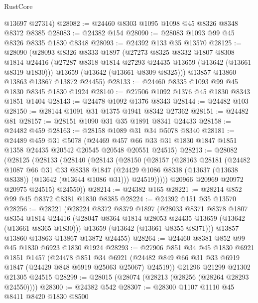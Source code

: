 \begin{lexlean}{RustCore}
\begin{coremodule}
      @13697
      @27314)
@28082 := @24460 @8303 @1095 @1098 @45 @8326 @8348 @8372 @8385
@28083 := @24382 @154
@28090 := @28083 @1093 @99 @45 @8326 @8335 @1830 @8348
@28093 := @24392 @133 @35 @13570
@28125 := @28090
    (@28093
      @8326
      @8333
      @1897
      (@27273
        @8325
        @8332
        @1807
        @8308
        @1814
        @24416
        (@27287 @8318 @1814 @27293 @24435 @13659 (@13642 (@13661 @8319 @1830)))
        @13659
        (@13642 (@13661 @8309 @8325)))
      @13857
      @13860
      @13863
      @13867
      @13872
      @24455)
@28133 := @24460 @8335 @1093 @99 @45 @1830 @8345 @1830 @1924
@28140 := @27506 @1092 @1376 @45 @1830 @8343 @1851 @1404
@28143 := @24478 @1092 @1376 @8343
@28144 := @24482 @103
@28150 := @28144 @1091 @31 @1375 @1941 @8342 @27362
@28151 := @24482 @81
@28157 := @28151 @1090 @31 @35 @1891 @8341 @24433
@28158 := @24482 @459
@28163 := @28158 @1089 @31 @34 @5078 @8340
@28181 := @24489
    @459
    @31
    @5078
    (@24469 @457 @66 @33 @31 @1830 @1847 @1851 @1358 @24435 @20542 @20545 @20548 @20551 @24515)
@28213 := @28082
    (@28125
      (@28133
        (@28140
          (@28143
            (@28150
              (@28157
                (@28163
                  @28181
                  (@24482
                    @1087
                    @66
                    @31
                    @33
                    @8338
                    @1847
                    (@24429 @1086 @8338 (@13637 (@13638 @8338)) (@13642 (@13644 @1086 @31)))
                    @24519)))))
          @20966
          @20969
          @20972
          @20975
          @24515)
        @24550))
@28214 := @24382 @165
@28221 := @28214 @852 @99 @45 @8372 @8381 @1830 @8385
@28224 := @24392 @151 @35 @13570
@28256 := @28221
    (@28224
      @8372
      @8379
      @1897
      (@28033
        @8371
        @8378
        @1807
        @8354
        @1814
        @24416
        (@28047 @8364 @1814 @28053 @24435 @13659 (@13642 (@13661 @8365 @1830)))
        @13659
        (@13642 (@13661 @8355 @8371)))
      @13857
      @13860
      @13863
      @13867
      @13872
      @24455)
@28264 := @24460 @8381 @852 @99 @45 @1830 @6923 @1830 @1924
@28293 := @27906
    @851
    @34
    @45
    @1830
    @6921
    @1851
    @1457
    (@24478
      @851
      @34
      @6921
      (@24482 @849 @66 @31 @33 @6919 @1847 (@24429 @848 @6919 @25063 @25067) @24519))
    @21296
    @21299
    @21302
    @21305
    @24515
@28299 := @28015 (@28074 (@28213 (@28256 (@28264 @28293 @24550))))
@28300 := @24382 @542
@28307 := @28300 @1107 @1110 @45 @8411 @8420 @1830 @8500

\end{coremodule}
\end{lexlean}
